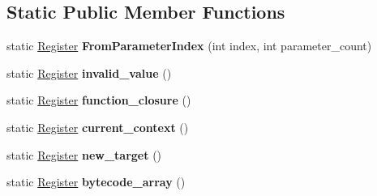 \subsection*{Static Public Member Functions}
\begin{DoxyCompactItemize}
\item 
static \hyperlink{classv8_1_1internal_1_1interpreter_1_1_register}{Register} {\bfseries From\+Parameter\+Index} (int index, int parameter\+\_\+count)\hypertarget{classv8_1_1internal_1_1interpreter_1_1_register_a7fc106af8e63f492b6c11182b112c5c8}{}\label{classv8_1_1internal_1_1interpreter_1_1_register_a7fc106af8e63f492b6c11182b112c5c8}

\item 
static \hyperlink{classv8_1_1internal_1_1interpreter_1_1_register}{Register} {\bfseries invalid\+\_\+value} ()\hypertarget{classv8_1_1internal_1_1interpreter_1_1_register_a8c4fe2464e42a936df346e100019ba0b}{}\label{classv8_1_1internal_1_1interpreter_1_1_register_a8c4fe2464e42a936df346e100019ba0b}

\item 
static \hyperlink{classv8_1_1internal_1_1interpreter_1_1_register}{Register} {\bfseries function\+\_\+closure} ()\hypertarget{classv8_1_1internal_1_1interpreter_1_1_register_a37c4c5dab862b4b59d28e23d3814033d}{}\label{classv8_1_1internal_1_1interpreter_1_1_register_a37c4c5dab862b4b59d28e23d3814033d}

\item 
static \hyperlink{classv8_1_1internal_1_1interpreter_1_1_register}{Register} {\bfseries current\+\_\+context} ()\hypertarget{classv8_1_1internal_1_1interpreter_1_1_register_ab378d180a76e34b0d4747c8300f9328d}{}\label{classv8_1_1internal_1_1interpreter_1_1_register_ab378d180a76e34b0d4747c8300f9328d}

\item 
static \hyperlink{classv8_1_1internal_1_1interpreter_1_1_register}{Register} {\bfseries new\+\_\+target} ()\hypertarget{classv8_1_1internal_1_1interpreter_1_1_register_a54d988c30bb8c9c79cc8dbace48c8d0a}{}\label{classv8_1_1internal_1_1interpreter_1_1_register_a54d988c30bb8c9c79cc8dbace48c8d0a}

\item 
static \hyperlink{classv8_1_1internal_1_1interpreter_1_1_register}{Register} {\bfseries bytecode\+\_\+array} ()\hypertarget{classv8_1_1internal_1_1interpreter_1_1_register_a64e138ee449854ff97f57fcb1da834df}{}\label{classv8_1_1internal_1_1interpreter_1_1_register_a64e138ee449854ff97f57fcb1da834df}


\end{DoxyCompactItemize}
